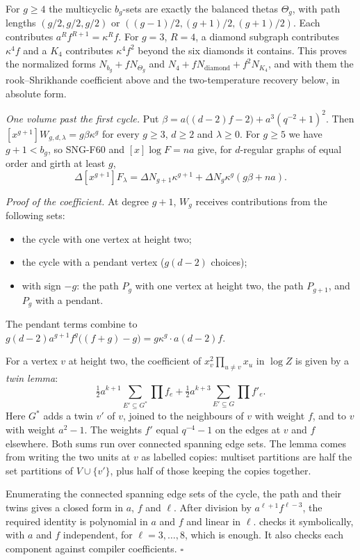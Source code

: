 \documentclass[
  11pt,
  a4paper,
]{report}
\providecommand{\tightlist}{%
  \setlength{\itemsep}{0pt}\setlength{\parskip}{0pt}}
\let\singularitytexttt\texttt
\renewcommand{\texttt}[1]{\singularitytexttt{\seqsplit{#1}}}
\begin{document}
For \(g\ge4\) the multicyclic \(b_g\)-sets are exactly the balanced
thetas \(\Theta_g\), with path lengths \((g/2,g/2,g/2)\) or
\(((g-1)/2,(g+1)/2,(g+1)/2)\). Each contributes
\(a^Rf^{R+1}=\kappa^Rf\). For \(g=3\), \(R=4\), a diamond subgraph
contributes \(\kappa^4f\) and a \(K_4\) contributes \(\kappa^4f^2\)
beyond the six diamonds it contains. This proves the normalized forms
\(N_{b_g}+fN_{\Theta_g}\) and \(N_4+fN_{\mathrm{diamond}}+f^2N_{K_4}\),
and with them the rook--Shrikhande coefficient above and the
two-temperature recovery below, in absolute form.

\emph{One volume past the first cycle.} Put
\(\beta=a\bigl((d-2)f-2\bigr)+a^3(q^{-2}+1)^2\). Then
\([x^{g+1}]W_{g,d,\lambda}=g\beta\kappa^g\) for every \(g\ge3\),
\(d\ge2\) and \(\lambda\ge0\). For \(g\ge5\) we have \(g+1<b_g\), so
SNG-F60 and \([x]\log F=na\) give, for \(d\)-regular graphs of equal
order and girth at least \(g\), \[
\Delta[x^{g+1}]F_\lambda=\Delta N_{g+1}\kappa^{g+1}+\Delta N_g\kappa^g(g\beta+na).
\]

\emph{Proof of the coefficient.} At degree \(g+1\), \(W_g\) receives
contributions from the following sets:

\begin{itemize}
\tightlist
\item
  the cycle with one vertex at height two;
\item
  the cycle with a pendant vertex (\(g(d-2)\) choices);
\item
  with sign \(-g\): the path \(P_g\) with one vertex at height two, the
  path \(P_{g+1}\), and \(P_g\) with a pendant.
\end{itemize}

The pendant terms combine to
\(g(d-2)a^{g+1}f^g\bigl((f+g)-g\bigr)=g\kappa^g\cdot a(d-2)f\).

For a vertex \(v\) at height two, the coefficient of
\(x_v^2\prod_{u\ne v}x_u\) in \(\log Z\) is given by a \emph{twin
lemma}: \[
\tfrac12a^{k+1}\sum_{E'\subseteq G^*}\prod f_e+\tfrac12a^{k+3}\sum_{E'\subseteq G}\prod f'_e .
\] Here \(G^*\) adds a twin \(v'\) of \(v\), joined to the neighbours of
\(v\) with weight \(f\), and to \(v\) with weight \(a^2-1\). The weights
\(f'\) equal \(q^{-4}-1\) on the edges at \(v\) and \(f\) elsewhere.
Both sums run over connected spanning edge sets. The lemma comes from
writing the two units at \(v\) as labelled copies: multiset partitions
are half the set partitions of \(V\cup\{v'\}\), plus half of those
keeping the copies together.

Enumerating the connected spanning edge sets of the cycle, the path and
their twins gives a closed form in \(a\), \(f\) and \(\ell\). After
division by \(a^{\ell+1}f^{\ell-3}\), the required identity is
polynomial in \(a\) and \(f\) and linear in \(\ell\).
\texttt{scripts/loop\_series.py} checks it symbolically, with \(a\) and
\(f\) independent, for \(\ell=3,\ldots,8\), which is enough. It also
checks each component against compiler coefficients. \(\square\)
\end{document}
